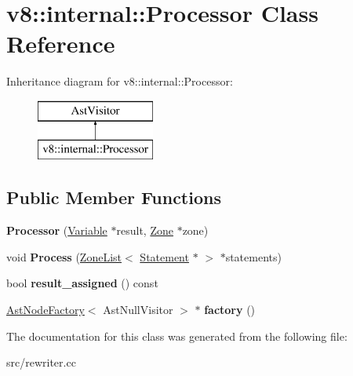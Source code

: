 \hypertarget{classv8_1_1internal_1_1_processor}{}\section{v8\+:\+:internal\+:\+:Processor Class Reference}
\label{classv8_1_1internal_1_1_processor}
Inheritance diagram for v8\+:\+:internal\+:\+:Processor\+:\begin{figure}[H]
\begin{center}
\leavevmode
\includegraphics[height=2.000000cm]{classv8_1_1internal_1_1_processor}
\end{center}
\end{figure}
\subsection*{Public Member Functions}
\begin{DoxyCompactItemize}
\item 
\hypertarget{classv8_1_1internal_1_1_processor_a124132ccbbdc516bb000738c61ae37ca}{}{\bfseries Processor} (\hyperlink{classv8_1_1internal_1_1_variable}{Variable} $\ast$result, \hyperlink{classv8_1_1internal_1_1_zone}{Zone} $\ast$zone)\label{classv8_1_1internal_1_1_processor_a124132ccbbdc516bb000738c61ae37ca}

\item 
\hypertarget{classv8_1_1internal_1_1_processor_a741c174cc2b93af87ae5bfed3471cb24}{}void {\bfseries Process} (\hyperlink{classv8_1_1internal_1_1_zone_list}{Zone\+List}$<$ \hyperlink{classv8_1_1internal_1_1_statement}{Statement} $\ast$ $>$ $\ast$statements)\label{classv8_1_1internal_1_1_processor_a741c174cc2b93af87ae5bfed3471cb24}

\item 
\hypertarget{classv8_1_1internal_1_1_processor_a3ed0da0296d8cae1005d74fc62e9d24d}{}bool {\bfseries result\+\_\+assigned} () const \label{classv8_1_1internal_1_1_processor_a3ed0da0296d8cae1005d74fc62e9d24d}

\item 
\hypertarget{classv8_1_1internal_1_1_processor_acb1266540af0170aebb4ed65f93a13b2}{}\hyperlink{classv8_1_1internal_1_1_ast_node_factory}{Ast\+Node\+Factory}$<$ Ast\+Null\+Visitor $>$ $\ast$ {\bfseries factory} ()\label{classv8_1_1internal_1_1_processor_acb1266540af0170aebb4ed65f93a13b2}

\end{DoxyCompactItemize}


The documentation for this class was generated from the following file\+:\begin{DoxyCompactItemize}
\item 
src/rewriter.\+cc\end{DoxyCompactItemize}
